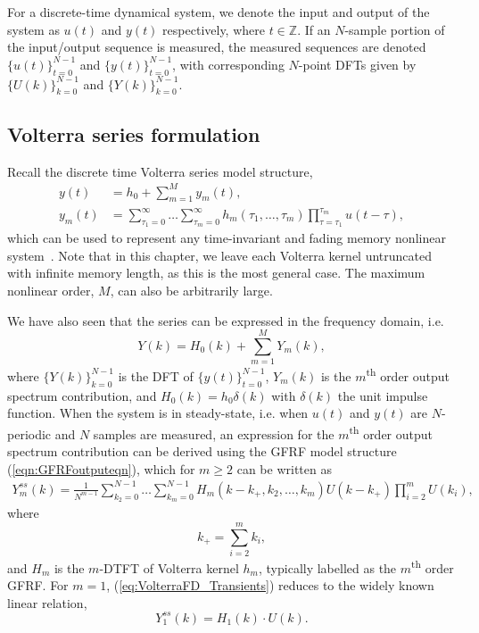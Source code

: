 \begin{notation}
For a discrete-time dynamical system, we denote the input and output of the system as $u(t)$ and $y(t)$ respectively, where $t \in \mathbb{Z}$. If an $N$-sample portion of the input/output sequence is measured, the measured sequences are denoted $\{u(t)\}_{t=0}^{N-1}$ and $\{y(t)\}_{t=0}^{N-1}$, with corresponding $N$-point DFTs given by $\{U(k)\}_{k=0}^{N-1}$ and $\{Y(k)\}_{k=0}^{N-1}$.
\end{notation}

\subsection{Volterra series formulation}

Recall the discrete time Volterra series model structure,
\begin{equation}
\begin{aligned}
\label{eq:VolterraTD_Transients}
y(t) &= h_0 + \sum_{m=1}^{M} y_m(t), \\
y_m(t) &= \sum_{\tau_1=0}^{\infty} \hdots \sum_{\tau_m=0}^{\infty} h_m(\tau_1,\hdots,\tau_m) \prod_{\tau = \tau_1}^{\tau_m} u(t-\tau),
\end{aligned}
\end{equation}
which can be used to represent any time-invariant and fading memory nonlinear system~\cite{Boyd1985}. Note that in this chapter, we leave each Volterra kernel untruncated with infinite memory length, as this is the most general case. The maximum nonlinear order, $M$, can also be arbitrarily large.

We have also seen that the series can be expressed in the frequency domain, i.e.
\begin{equation}
Y(k) = H_0(k) + \sum_{m=1}^{M} Y_m(k),
\end{equation}
where $\{Y(k)\}_{k=0}^{N-1}$ is the DFT of $\{y(t)\}_{t=0}^{N-1}$, $Y_m(k)$ is the $m$\textsuperscript{th} order output spectrum contribution, and $H_0(k) = h_0 \delta(k)$ with $\delta(k)$ the unit impulse function. When the system is in steady-state, i.e. when $u(t)$ and $y(t)$ are $N$-periodic and $N$ samples are measured, an expression for the $m$\textsuperscript{th} order output spectrum contribution can be derived using the GFRF model structure (\ref{eqn:GFRFoutputeqn}), which for $m \geq 2$ can be written as
\begin{align}
\label{eq:VolterraFD_Transients}
Y_m^{ss}(k) = \frac{1}{N^{m-1}} \sum_{k_2=0}^{N-1} \hdots \sum_{k_m=0}^{N-1} H_m(k-k_+,k_2,\hdots,k_m) U(k-k_+) \prod_{i=2}^{m}U(k_i), 
\end{align}
where
\begin{equation}
k_+ = \sum_{i=2}^{m} k_i,
\end{equation} 
and $H_m$ is the $m$-DTFT of Volterra kernel $h_m$, typically labelled as the $m$\textsuperscript{th} order GFRF. For $m=1$, (\ref{eq:VolterraFD_Transients}) reduces to the widely known linear relation,
\begin{equation}
\label{eq:VolterraFDLin_Transients}
Y_1^{ss}(k) = H_1(k) \cdot U(k).
\end{equation} 

